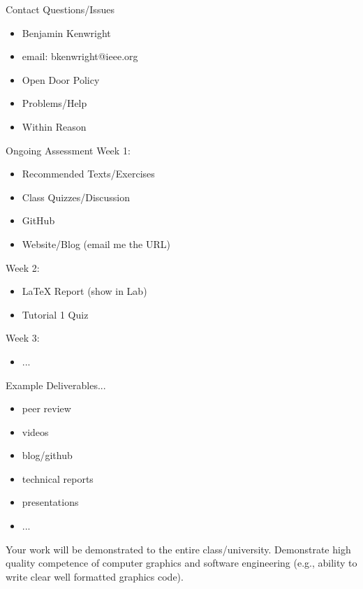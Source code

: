 \documentclass[handout,18pt]{beamer}
\begin{document}
\begin{frame}{Contact}
Questions/Issues

\begin{itemize}
\item Benjamin Kenwright
\item email: bkenwright@ieee.org
\end{itemize}

\vspace{20pt}
\begin{itemize}
\item Open Door Policy 
\item Problems/Help 
\item Within Reason 
\end{itemize}

\end{frame}


\begin{frame}{Ongoing Assessment}
	\pause
	Week 1:
	\begin{itemize}
		\item Recommended Texts/Exercises
        \item Class Quizzes/Discussion
		\item GitHub  
		\item Website/Blog (email me the URL)
	\end{itemize}
	\vspace{11pt}
	\pause
	
	Week 2:
	\begin{itemize}
		\item LaTeX Report (show in Lab)
		\item Tutorial 1 Quiz
	\end{itemize}
	
	Week 3:
	\begin{itemize}
		\item ...
	\end{itemize}
	
\end{frame}


\begin{frame}{Example}
	\pause
	Deliverables...
	\begin{itemize}
		\item peer review
		\item videos 
		\item blog/github
		\item technical reports
		\item presentations
		\item ...
	\end{itemize}
	\vspace{11pt}
	\pause
	
	Your work will be demonstrated to the entire class/university.  Demonstrate high quality competence of computer graphics and software engineering (e.g., ability to write clear well formatted graphics code).
	
\end{frame}
\end{document}
